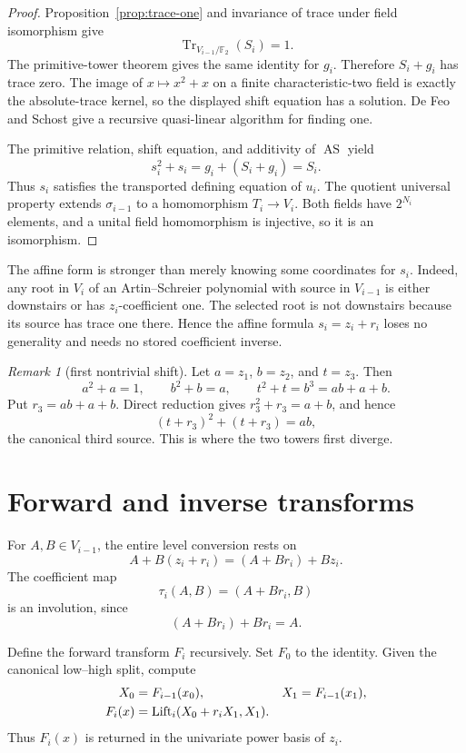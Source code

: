 \documentclass[11pt]{article}
\theoremstyle{definition}
\theoremstyle{remark}
\newtheorem{remark}[theorem]{Remark}
\newcommand{\F}{\mathbb F}
\newcommand{\AS}{\operatorname{AS}}
\newcommand{\Tr}{\operatorname{Tr}}
\newcommand{\Lift}{\operatorname{Lift}}
\begin{document}
\begin{proof}
Proposition~\ref{prop:trace-one} and invariance of trace under field
isomorphism give
\[
  \Tr_{V_{i-1}/\F_2}(S_i)=1.
\]
The primitive-tower theorem gives the same identity for $g_i$.  Therefore
$S_i+g_i$ has trace zero.  The image of $x\mapsto x^2+x$ on a finite
characteristic-two field is exactly the absolute-trace kernel, so
the displayed shift equation has a solution.  De Feo and Schost give a
recursive quasi-linear algorithm for finding one.

The primitive relation, shift equation, and additivity of $\AS$ yield
\[
  s_i^2+s_i
  =g_i+(S_i+g_i)=S_i.
\]
Thus $s_i$ satisfies the transported defining equation of $u_i$.  The quotient
universal property extends $\sigma_{i-1}$ to a homomorphism $T_i\to V_i$.
Both fields have $2^{N_i}$ elements, and a unital field homomorphism is
injective, so it is an isomorphism.
\end{proof}

The affine form is stronger than merely knowing some coordinates for $s_i$.
Indeed, any root in $V_i$ of an Artin--Schreier polynomial with source in
$V_{i-1}$ is either downstairs or has $z_i$-coefficient one.  The selected
root is not downstairs because its source has trace one there.  Hence
the affine formula $s_i=z_i+r_i$ loses no generality and needs no stored
coefficient inverse.

\begin{remark}[first nontrivial shift]
Let $a=z_1$, $b=z_2$, and $t=z_3$.  Then
\[
  a^2+a=1,
  \qquad
  b^2+b=a,
  \qquad
  t^2+t=b^3=ab+a+b.
\]
Put $r_3=ab+a+b$.  Direct reduction gives $r_3^2+r_3=a+b$, and hence
\[
  (t+r_3)^2+(t+r_3)=ab,
\]
the canonical third source.  This is where the two towers first diverge.
\end{remark}

\section{Forward and inverse transforms}

For $A,B\in V_{i-1}$, the entire level conversion rests on
\begin{equation}
  A+B(z_i+r_i)=(A+Br_i)+Bz_i.
\end{equation}
The coefficient map
\begin{equation}
  \tau_i(A,B)=(A+Br_i,B)
\end{equation}
is an involution, since
\[
  (A+Br_i)+Br_i=A.
\]

Define the forward transform $F_i$ recursively.  Set $F_0$ to the identity.
Given the canonical low--high split, compute
\begin{align}
  X_0&=F_{i-1}(x_0),&
  X_1&=F_{i-1}(x_1),\notag\\
  F_i(x)&=\Lift_i(X_0+r_iX_1,X_1).
\end{align}
Thus $F_i(x)$ is returned in the univariate power basis of $z_i$.
\end{document}
